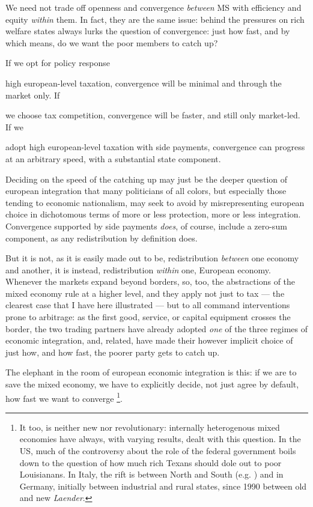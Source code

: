 \documentclass[11pt,a4paper,oneside,openright]{article}
\begin{document}

We need not trade off openness and convergence \emph{between} \gls{MS} with efficiency and equity \emph{within} them. 
In fact, they are the same issue: 
behind the pressures on rich welfare states always lurks the question of convergence: 
just how fast, and by which means, do we want the poor members to catch up?

If we opt for policy response \begin{inparaenum} 
	\item high european-level taxation, convergence will be minimal and through the market only. 
	If \item we choose tax competition, convergence will be faster, and still only market-led. 
	If we \item adopt high european-level taxation with side payments, convergence can progress at an arbitrary speed, with a substantial state component. 
	\end{inparaenum}

Deciding on the speed of the catching up may just be the deeper question of european integration that many politicians of all colors, but especially those tending to economic nationalism, may seek to avoid by misrepresenting european choice in dichotomous terms of more or less protection, more or less integration. 
Convergence supported by side payments \emph{does}, of course, include a zero-sum component, as any redistribution by definition does. 

But it is not, as it is easily made out to be, redistribution \emph{between} one economy and another, it is instead, redistribution \emph{within} one, European economy. 
Whenever the markets expand beyond borders, so, too, the abstractions of the mixed economy rule at a higher level, and they apply not just to tax --- the clearest case that I have here illustrated --- but to all command interventions prone to arbitrage: 
as the first good, service, or capital equipment crosses the border, the two trading partners have already adopted \emph{one} of the three regimes of economic integration, and, related, have made their however implicit choice of just how, and how fast, the poorer party gets to catch up.

The elephant in the room of european economic integration is this: 
if we are to save the mixed economy, we have to explicitly decide, not just agree by default, how fast we want to converge \footnote{
	It too, is neither new nor revolutionary: 
	internally heterogenous mixed economies have always, with varying results, dealt with this question. 
	In the US, much of the controversy about the role of the federal government boils down to the question of how much rich Texans should dole out to poor Louisianans. 
	In Italy, the rift is between North and South (e.g. \citealt{PutnamLeonardi-1993-aa}) and in Germany, initially between industrial and rural states, since 1990 between old and new \emph{Laender}.}.
\end{document}
